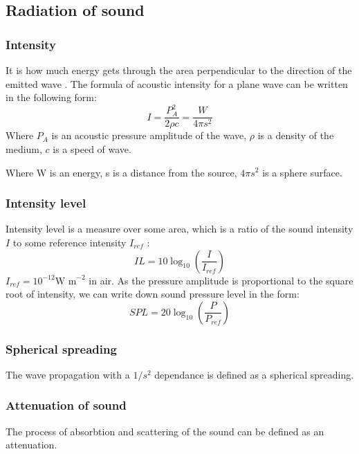 \subsection{Radiation of sound}

\subsubsection{Intensity} 
It is how much energy gets through the area perpendicular to the direction of the emitted wave \cite[p.18]{leighton_acoustic_2012}. The formula of acoustic intensity for a plane wave can be written in the following form:
\begin{equation}
    I = \frac{P_A^2}{2\rho c} = \frac{W}{4\pi s^2}
\end{equation}
Where $P_A$ is an acoustic pressure amplitude of the wave, $\rho$ is a density of the medium, $c$ is a speed of wave.

Where W is an energy, s is a distance from the source,
$4\pi s^2$ is a sphere surface.

\subsubsection{Intensity level}
Intensity level is a measure over some area, which is a ratio of the sound intensity $I$ to some reference intensity $I_{ref}$ \cite[p.19]{leighton_acoustic_2012}:
\begin{equation}
    IL = 10\log_{10}(\frac{I}{I_{ref}})    
\end{equation}
$I_{ref}=10^{-12}\text{W m}^{-2}$ in air.
As the pressure amplitude is proportional to the square root of intensity, we can write down sound pressure level in the form:
\begin{equation}
    SPL = 20\log_{10}(\frac{P}{P_{ref}})
\end{equation}

\subsubsection{Spherical spreading} 
The wave propagation with a $1/s^2$ dependance is defined as a spherical spreading.
\subsubsection{Attenuation  of sound}
The process of absorbtion and scattering of the sound can be defined as an attenuation. 


